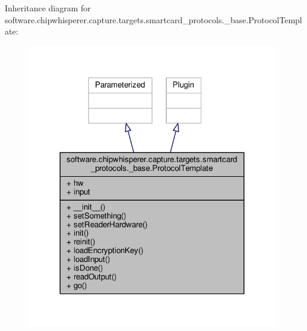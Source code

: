 Inheritance diagram for software.\+chipwhisperer.\+capture.\+targets.\+smartcard\+\_\+protocols.\+\_\+base.\+Protocol\+Template\+:\nopagebreak
\begin{figure}[H]
\begin{center}
\leavevmode
\includegraphics[width=312pt]{d8/d11/classsoftware_1_1chipwhisperer_1_1capture_1_1targets_1_1smartcard__protocols_1_1__base_1_1ProtocolTemplate__inherit__graph}
\end{center}
\end{figure}


